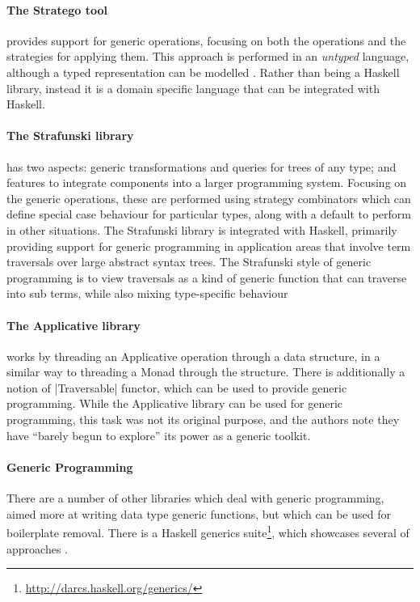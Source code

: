 \documentclass[preprint]{sigplanconf}
\let\cite=\citep
\begin{document}
\paragraph{The Stratego tool} \citep{stratego} provides support for generic operations, focusing on both the operations and the strategies for applying them. This approach is performed in an \textit{untyped} language, although a typed representation can be modelled \cite{lammel:typed_generic_strategies}. Rather than being a Haskell library, instead it is a domain specific language that can be integrated with Haskell.

\paragraph{The Strafunski library} \citep{strafunski, lammel:polymorphic_symphony} has two aspects: generic transformations and queries for trees of any type; and features to integrate components into a larger programming system. Focusing on the generic operations, these are performed using strategy combinators which can define special case behaviour for particular types, along with a default to perform in other situations. The Strafunski library is integrated with Haskell, primarily providing support for generic programming in application areas that involve term traversals over large abstract syntax trees. The Strafunski style of generic programming is to view traversals as a kind of generic function that can traverse into sub terms, while also mixing type-specific behaviour

\paragraph{The Applicative library} \citep{mcbride:applicative} works by threading an Applicative operation through a data structure, in a similar way to threading a Monad through the structure. There is additionally a notion of |Traversable| functor, which can be used to provide generic programming. While the Applicative library can be used for generic programming, this task was not its original purpose, and the authors note they have ``barely begun to explore'' its power as a generic toolkit.

\paragraph{Generic Programming} There are a number of other libraries which deal with generic programming, aimed more at writing data type generic functions, but which can be used for boilerplate removal. There is a Haskell generics suite\footnote{\url{http://darcs.haskell.org/generics/}}, which showcases several of approaches \citep{weirich:replib,hinze:generics_masses,oleg:smash,hinze:generic_haskell}.
\end{document}
